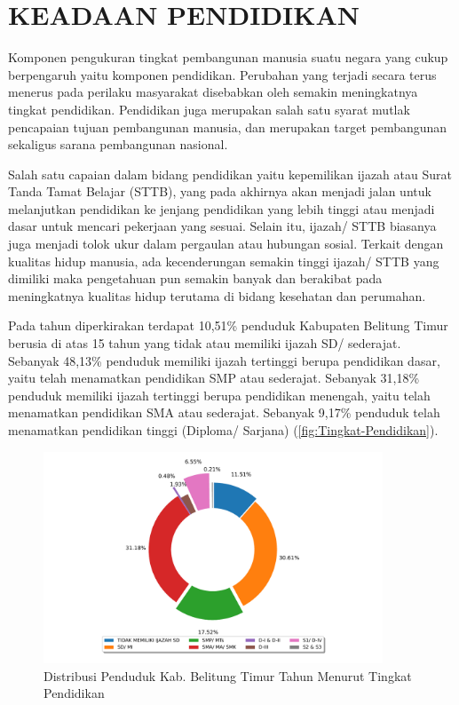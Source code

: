 \section{KEADAAN PENDIDIKAN}
Komponen pengukuran tingkat pembangunan manusia suatu negara yang
cukup berpengaruh yaitu komponen pendidikan. Perubahan yang terjadi
secara terus menerus pada perilaku masyarakat disebabkan oleh semakin
meningkatnya tingkat pendidikan. Pendidikan juga merupakan salah satu
syarat mutlak pencapaian tujuan pembangunan manusia, dan merupakan
target pembangunan sekaligus sarana pembangunan nasional.

Salah satu capaian dalam bidang pendidikan yaitu kepemilikan ijazah
atau Surat Tanda Tamat Belajar (STTB), yang pada akhirnya akan menjadi
jalan untuk melanjutkan pendidikan ke jenjang pendidikan yang lebih
tinggi atau menjadi dasar untuk mencari pekerjaan yang sesuai. Selain
itu, ijazah/ STTB biasanya juga menjadi tolok ukur dalam pergaulan
atau hubungan sosial. Terkait dengan kualitas hidup manusia, ada kecenderungan semakin tinggi
ijazah/ STTB yang dimiliki maka pengetahuan pun semakin banyak dan
berakibat pada meningkatnya kualitas hidup terutama di bidang kesehatan
dan perumahan.

Pada tahun \tP diperkirakan terdapat 10,51\% penduduk Kabupaten Belitung Timur berusia di atas 15 tahun yang tidak atau memiliki ijazah SD/ sederajat. Sebanyak 48,13\% penduduk memiliki ijazah tertinggi berupa pendidikan dasar, yaitu telah menamatkan pendidikan SMP atau sederajat. Sebanyak 31,18\% penduduk memiliki ijazah tertinggi berupa pendidikan menengah, yaitu telah menamatkan pendidikan SMA atau sederajat. Sebanyak 9,17\% penduduk telah menamatkan pendidikan tinggi (Diploma/ Sarjana) (\autoref{fig:Tingkat-Pendidikan}).

\begin{figure}[H]
    \centering
    \includegraphics[width=0.9\textwidth]{bab_01/bab_01_03_distribusiPendidikan}
    \caption{Distribusi Penduduk Kab. Belitung Timur Tahun \tP Menurut Tingkat Pendidikan}
    \label{fig:Tingkat-Pendidikan}
\end{figure}
